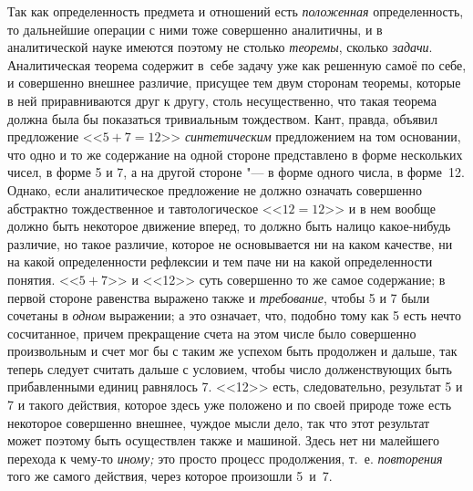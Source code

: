 Так как определенность предмета и отношений есть {\em положенная}
определенность, то дальнейшие операции с ними тоже совершенно
аналитичны, и в аналитической науке имеются поэтому не столько
{\em теоремы}, сколько {\em задачи}.
Аналитическая теорема содержит в~себе задачу уже как решенную
самоё по себе, и совершенно внешнее различие, присущее тем двум сторонам
теоремы, которые в ней приравниваются друг к другу, столь несущественно,
что такая теорема должна была бы показаться тривиальным тождеством. Кант,
правда, объявил предложение <<$5+7=12$>> {\em синтетическим}
предложением на том основании, что одно и то же содержание на
одной стороне представлено в форме нескольких чисел, в форме 5 и 7, а на
другой стороне "--- в форме одного числа, в форме~12.
Однако, если аналитическое предложение не
должно означать совершенно абстрактно тождественное и тавтологическое
<<$12=12$>> и в нем вообще должно быть некоторое движение вперед, то должно
быть налицо какое-нибудь различие, но такое различие, которое не
основывается ни на каком качестве, ни на какой определенности рефлексии и
тем паче ни на какой определенности понятия. <<$5+7$>> и <<12>> суть совершенно
то же самое содержание; в первой стороне равенства выражено также и
{\em требование}, чтобы 5 и 7 были сочетаны в {\em одном}
выражении; а это означает, что, подобно тому как 5 есть нечто
сосчитанное, причем прекращение счета на этом числе было совершенно
произвольным и счет мог бы с таким же успехом быть продолжен и дальше, так
теперь следует считать дальше с условием, чтобы число долженствующих быть
прибавленными единиц равнялось 7. <<12>> есть, следовательно, результат 5 и 7
и такого действия, которое здесь уже положено и по своей природе тоже есть
некоторое совершенно внешнее, чуждое мысли дело, так что этот результат
может поэтому быть осуществлен также и машиной. Здесь нет ни малейшего
перехода к чему-то {\em иному;} это просто процесс продолжения, т.~е.
{\em повторения} того же самого действия, через которое произошли 5~и~7.

